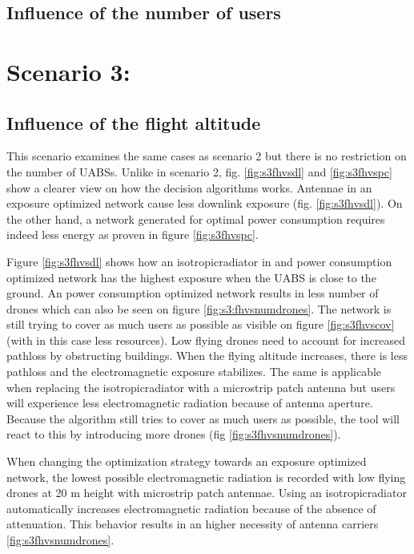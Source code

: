 \subsection{Influence of the number of users}


\newpage
\section{Scenario 3:}
\subsection{Influence of the flight altitude}

This scenario examines the same cases as scenario 2 but there is no restriction on the number of \gls{UABS}s. 
Unlike in scenario 2, fig. \ref{fig:s3fhvsdl} and \ref{fig:s3fhvspc} show a clearer view on how the decision algorithms
works. Antennae in an exposure optimized network cause less downlink exposure (fig. \ref{fig:s3fhvsdl}). On the other hand, 
a network generated for optimal power consumption requires indeed less energy as proven in figure \ref{fig:s3fhvspc}. 

Figure \ref{fig:s3fhvsdl} shows how an \gls{isotropicradiator} in and power consumption optimized network has the highest exposure when 
the \gls{UABS}  is close to the ground. An power consumption optimized network results in less number of drones which can also be seen 
on figure \ref{fig:s3:fhvsnumdrones}. The network is still trying to cover as much users as possible as visible on figure 
\ref{fig:s3fhvscov} (with in this case less resources). Low flying drones need to account for increased pathloss by obstructing buildings.
When the flying altitude increases, there is less pathloss and the electromagnetic exposure stabilizes. The same is applicable when replacing
the \gls{isotropicradiator} with a microstrip patch antenna but users will experience less electromagnetic radiation 
because of antenna aperture. Because the algorithm still tries to cover as much users as possible, the tool will react to this by 
introducing more drones (fig \ref{fig:s3fhvsnumdrones}).

When changing the optimization strategy towards an exposure optimized network, the lowest possible electromagnetic radiation is recorded
with low flying drones at 20 m height with microstrip patch antennae. Using an \gls{isotropicradiator} automatically increases electromagnetic 
radiation because of the absence of attenuation. This behavior results in an higher necessity of antenna carriers \ref{fig:s3fhvsnumdrones}.



